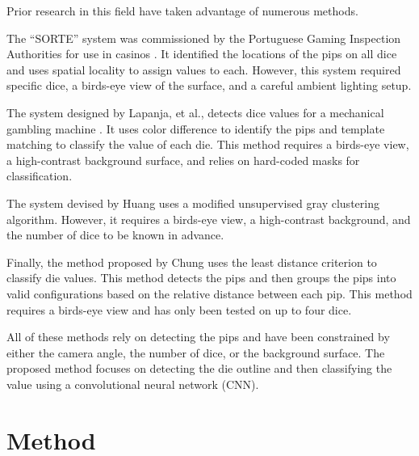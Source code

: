 \documentclass[conference]{IEEEtran}
\begin{document}

Prior research in this field have taken advantage of numerous methods.

The ``SORTE'' system was commissioned by the Portuguese Gaming Inspection Authorities for use in casinos \cite{Correia1995}.
It identified the locations of the pips on all dice and uses spatial locality to assign values to each.
However, this system required specific dice, a birds-eye view of the surface, and a careful ambient lighting setup.

The system designed by Lapanja, et al., detects dice values for a mechanical gambling machine \cite{Lapanjaa}.
It uses color difference to identify the pips and template matching to classify the value of each die.
This method requires a birds-eye view, a high-contrast background surface, and relies on hard-coded masks for classification.

The system devised by Huang \cite{Huang2008} uses a modified unsupervised gray clustering algorithm. 
However, it requires a birds-eye view, a high-contrast background, and the number of dice to be known in advance.

Finally, the method proposed by Chung \cite{Chung2009} uses the least distance criterion to classify die values.
This method detects the pips and then groups the pips into valid configurations based on the relative distance between each pip.
This method requires a birds-eye view and has only been tested on up to four dice.

All of these methods rely on detecting the pips and have been constrained by either the camera angle, the number of dice, or the background surface.
The proposed method focuses on detecting the die outline and then classifying the value using a convolutional neural network (CNN).

\section{Method}
\end{document}
